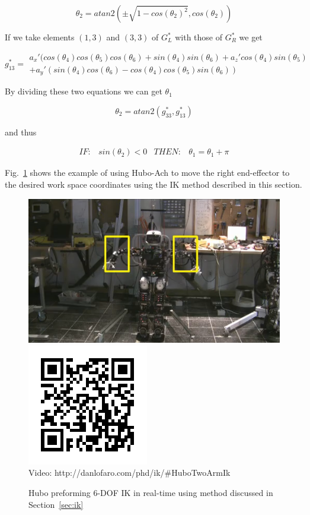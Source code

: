 \begin{equation}
\theta_2 = atan2(\pm \sqrt{1-cos(\theta_2)^2}, cos(\theta_2))
\end{equation}

If we take elements $(1,3)$ and $(3,3)$ of $G^*_L$ with those of $G^*_R$ we get

\begin{equation}
g^*_{13} = \begin{array}{l} a_x'( cos(\theta_4)cos(\theta_5)cos(\theta_6) + sin(\theta_4)sin(\theta_6) + a_z'cos(\theta_4)sin(\theta_5) \\
+ a_y'(sin(\theta_4)cos(\theta_6)-cos(\theta_4)cos(\theta_5)sin(\theta_6))
\end{array}
\end{equation}

By dividing these two equations we can get $\theta_1$

\begin{equation}
\theta_2 = atan2(g^*_{33}, g^*_{13})
\end{equation}

and thus

\begin{equation}
\begin{array}{rcrc}IF:& sin(\theta_2)<0 & THEN: & \theta_1 = \theta_1 + \pi
\end{array}
\end{equation}

Fig.~\ref{fig:6dofik} shows the example of using Hubo-Ach to move the right end-effector to the desired work space coordinates using the IK method described in this section.

\begin{figure}[thpb]
  \centering
      \includegraphics[width=0.69\columnwidth]{./pix/6dofik2hands.png}
      \includegraphics[width=0.3\columnwidth]{./qrcode/qrcode-6dofik.png}\\
      Video: http://danlofaro.com/phd/ik/\#HuboTwoArmIk
\caption{Hubo preforming 6-DOF IK in real-time using method discussed in Section~\ref{sec:ik}}
\label{fig:6dofik}
\end{figure}
